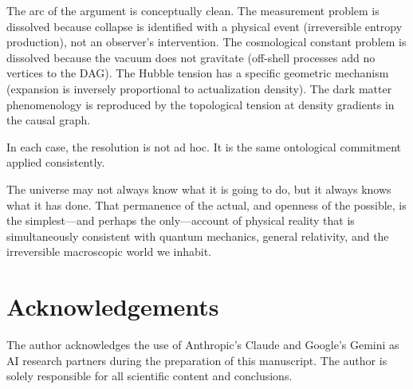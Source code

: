 \documentclass[11pt,twocolumn]{article}
\theoremstyle{plain}
\theoremstyle{remark}
\begin{document}
The arc of the argument is conceptually clean.
The measurement problem is dissolved because collapse is identified
with a physical event (irreversible entropy production), not an
observer's intervention.
The cosmological constant problem is dissolved because the vacuum
does not gravitate (off-shell processes add no vertices to the DAG).
The Hubble tension has a specific geometric mechanism (expansion is
inversely proportional to actualization density).
The dark matter phenomenology is reproduced by the topological
tension at density gradients in the causal graph.

In each case, the resolution is not ad hoc.
It is the same ontological commitment applied consistently.

The universe may not always know what it is going to do, but it
always knows what it has done.
That permanence of the actual, and openness of the possible, is the
simplest---and perhaps the only---account of physical reality that
is simultaneously consistent with quantum mechanics, general
relativity, and the irreversible macroscopic world we inhabit.

\section*{Acknowledgements}
The author acknowledges the use of Anthropic's Claude and Google's Gemini
as AI research partners during the preparation of this manuscript.
The author is solely responsible for all scientific content and conclusions.
\end{document}
